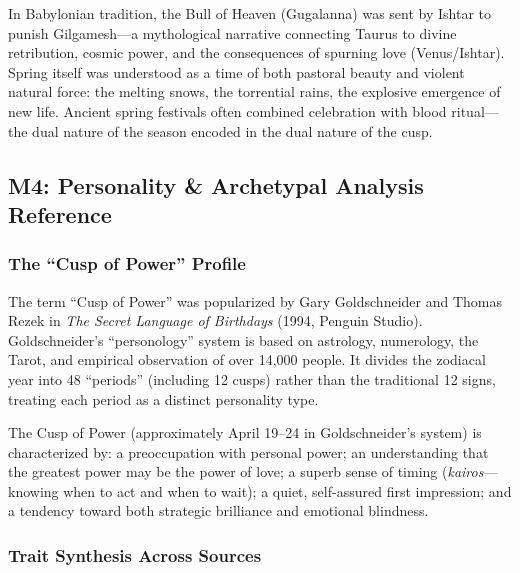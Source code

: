 \documentclass[11pt,letterpaper]{article}
\begin{document}
In Babylonian tradition, the Bull of Heaven (Gugalanna) was sent by Ishtar to punish Gilgamesh---a mythological narrative connecting Taurus to divine retribution, cosmic power, and the consequences of spurning love (Venus/Ishtar). Spring itself was understood as a time of both pastoral beauty and violent natural force: the melting snows, the torrential rains, the explosive emergence of new life. Ancient spring festivals often combined celebration with blood ritual---the dual nature of the season encoded in the dual nature of the cusp.

\subsection{M4: Personality \& Archetypal Analysis Reference}

\subsubsection{The ``Cusp of Power'' Profile}

The term ``Cusp of Power'' was popularized by Gary Goldschneider and Thomas Rezek in \textit{The Secret Language of Birthdays} (1994, Penguin Studio). Goldschneider's ``personology'' system is based on astrology, numerology, the Tarot, and empirical observation of over 14,000 people. It divides the zodiacal year into 48 ``periods'' (including 12 cusps) rather than the traditional 12 signs, treating each period as a distinct personality type.

The Cusp of Power (approximately April 19--24 in Goldschneider's system) is characterized by: a preoccupation with personal power; an understanding that the greatest power may be the power of love; a superb sense of timing (\textit{kairos}---knowing when to act and when to wait); a quiet, self-assured first impression; and a tendency toward both strategic brilliance and emotional blindness.

\subsubsection{Trait Synthesis Across Sources}
\end{document}
